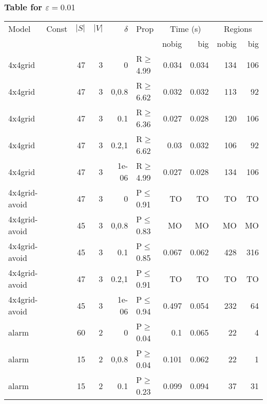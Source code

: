 \subsubsection{Table for \(\varepsilon=0.01\)}
\begin{longtable}{llrrrlrrrr}

        \toprule
        Model & Const & $|S|$ & $|V|$ & $\delta$ & Prop & \multicolumn{2}{c}{Time (s)} & \multicolumn{2}{c}{Regions} \\
        \cmidrule(ll){7-8} \cmidrule(ll){9-10}
        & & & & & & nobig & big & nobig & big \\
        \midrule
        
 4x4grid       &          &     	47 &   3 & 0     & R$\geq$4.99  & 0.034   & 0.034    & 134    & 106    \\
 4x4grid       &          &     	47 &   3 & 0,0.8 & R$\geq$6.62  & 0.032   & 0.032    & 113    & 92     \\
 4x4grid       &          &     	47 &   3 & 0.1   & R$\geq$6.36  & 0.027   & 0.028    & 120    & 106    \\
 4x4grid       &          &     	47 &   3 & 0.2,1 & R$\geq$6.62  & 0.03    & 0.032    & 106    & 92     \\
 4x4grid       &          &     	47 &   3 & 1e-06 & R$\geq$4.99  & 0.027   & 0.028    & 134    & 106    \\
 4x4grid-avoid &          &     	47 &   3 & 0     & P$\leq$0.91  & TO      & TO       & TO     & TO     \\
 4x4grid-avoid &          &     	45 &   3 & 0,0.8 & P$\leq$0.83  & MO      & MO       & MO     & MO     \\
 4x4grid-avoid &          &     	45 &   3 & 0.1   & P$\leq$0.85  & 0.067   & 0.062    & 428    & 316    \\
 4x4grid-avoid &          &     	47 &   3 & 0.2,1 & P$\leq$0.91  & TO      & TO       & TO     & TO     \\
 4x4grid-avoid &          &     	45 &   3 & 1e-06 & P$\leq$0.94  & 0.497   & 0.054    & 232    & 64     \\
 alarm         &          &     	60 &   2 & 0     & P$\geq$0.04  & 0.1     & 0.065    & 22     & 4      \\
 alarm         &          &     	15 &   2 & 0,0.8 & P$\geq$0.04  & 0.101   & 0.062    & 22     & 1      \\
 alarm         &          &     	15 &   2 & 0.1   & P$\geq$0.23  & 0.099   & 0.094    & 37     & 31     \\

\end{longtable}
